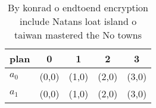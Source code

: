 \documentclass[a4paper]{article}
\begin{document}
\begin{table}
\begin{adjustbox}{width=0.5\columnwidth}
\begin{tabular}{|l|l|l|l|l|}
\hline
\textbf{plan} & \multicolumn{1}{c|}{\textbf{0}} & \multicolumn{1}{c|}{\textbf{1}} & \multicolumn{1}{c|}{\textbf{2}} & \multicolumn{1}{c|}{\textbf{3}} \\ \hline
\textbf{$a_0$}  & (0,0) & (1,0) & (2,0) & (3,0) \\ \hline
\textbf{$a_1$}  & (0,0) & (1,0) & (2,0) & (3,0) \\ \hline
\end{tabular}
\end{adjustbox}
\caption{By konrad o endtoend encryption include Natans loat island o taiwan mastered the No towns
}
\end{table}
\end{document}
